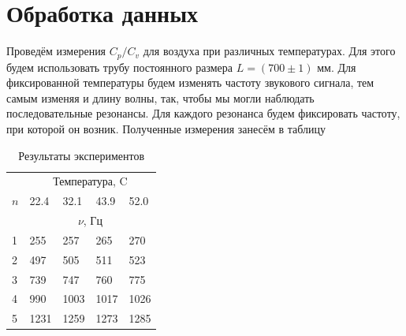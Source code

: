 \documentclass{article}
\begin{document}
\newpage


\section*{Обработка данных}

Проведём измерения $ C_p/C_v $ для воздуха при различных температурах. Для этого будем использовать трубу постоянного размера $ L = (700 \pm 1) $ мм. Для фиксированной температуры будем изменять частоту звукового сигнала, тем самым изменяя и длину волны, так, чтобы мы могли наблюдать последовательные резонансы. Для каждого резонанса будем фиксировать частоту, при которой он возник. Полученные измерения занесём в таблицу %

\begin{table}[h!]
	\centering
	\begin{tabular}{|lllll|}
		\hline
		\multicolumn{1}{|c|}{}    & \multicolumn{4}{|c|}{Температура, C}                                                                \\ \cline{2-5}
		\multicolumn{1}{|c|}{$n$} & \multicolumn{1}{l|}{22.4}            & \multicolumn{1}{l|}{32.1} & \multicolumn{1}{l|}{43.9} & 52.0 \\ \cline{2-5}
		\multicolumn{1}{|c|}{}    & \multicolumn{4}{c|}{$\nu$, Гц}                                                                      \\ \hline
		\multicolumn{1}{|l|}{1}   & \multicolumn{1}{l|}{255}             & \multicolumn{1}{l|}{257}  & \multicolumn{1}{l|}{265}  & 270  \\ \hline
		\multicolumn{1}{|l|}{2}   & \multicolumn{1}{l|}{497}             & \multicolumn{1}{l|}{505}  & \multicolumn{1}{l|}{511}  & 523  \\ \hline
		\multicolumn{1}{|l|}{3}   & \multicolumn{1}{l|}{739}             & \multicolumn{1}{l|}{747}  & \multicolumn{1}{l|}{760}  & 775  \\ \hline
		\multicolumn{1}{|l|}{4}   & \multicolumn{1}{l|}{990}             & \multicolumn{1}{l|}{1003} & \multicolumn{1}{l|}{1017} & 1026 \\ \hline
		\multicolumn{1}{|l|}{5}   & \multicolumn{1}{l|}{1231}            & \multicolumn{1}{l|}{1259} & \multicolumn{1}{l|}{1273} & 1285 \\ \hline
	\end{tabular}
	\caption{Результаты экспериментов}
\end{table}

\end{document}

